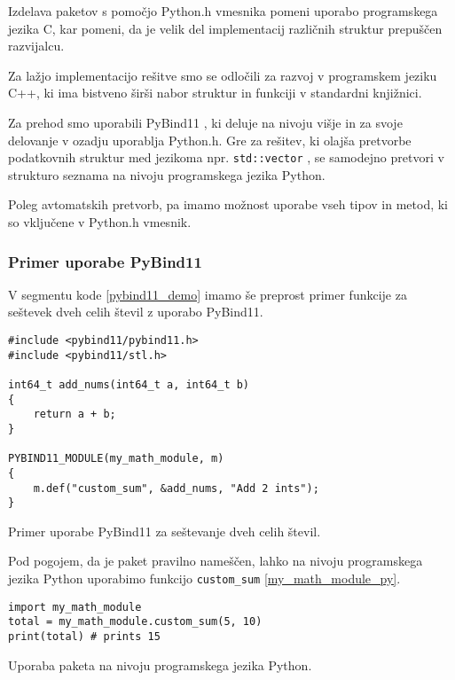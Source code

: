 \documentclass[a4paper,12pt,openright]{book}
\begin{document}
    Izdelava paketov s pomočjo Python.h vmesnika pomeni uporabo programskega jezika C, kar pomeni, da je velik del implementacij različnih struktur prepuščen razvijalcu.
    
    Za lažjo implementacijo rešitve smo se odločili za razvoj v programskem jeziku C++, ki ima bistveno širši nabor struktur in funkciji v standardni knjižnici. 

    Za prehod smo uporabili PyBind11 \cite{PYBIND11_GITHUB}, ki deluje na nivoju višje in za svoje delovanje v ozadju uporablja Python.h. Gre za rešitev, ki olajša pretvorbe podatkovnih struktur med jezikoma npr. {\tt std::vector} \cite{CPP_VECTOR}, se samodejno pretvori v strukturo seznama na nivoju programskega jezika Python.

    Poleg avtomatskih pretvorb, pa imamo možnost uporabe vseh tipov in metod, ki so vključene v Python.h vmesnik.

    \subsubsection{Primer uporabe PyBind11}
    V segmentu kode \ref{pybind11_demo} imamo še preprost primer funkcije za seštevek dveh celih števil z uporabo PyBind11.

\begin{code}
\begin{verbatim}
#include <pybind11/pybind11.h>
#include <pybind11/stl.h>

int64_t add_nums(int64_t a, int64_t b)
{
    return a + b;
}

PYBIND11_MODULE(my_math_module, m)
{
    m.def("custom_sum", &add_nums, "Add 2 ints");
}
\end{verbatim}
\caption{Primer uporabe PyBind11 za seštevanje dveh celih števil.}
\label{pybind11_demo}
\end{code}

    \noindent
    Pod pogojem, da je paket pravilno nameščen, lahko na nivoju programskega jezika Python uporabimo funkcijo {\tt custom\_sum} \ref{my_math_module_py}.

\begin{code}
\begin{verbatim}
import my_math_module
total = my_math_module.custom_sum(5, 10)
print(total) # prints 15
\end{verbatim}
\caption{Uporaba paketa na nivoju programskega jezika Python.}
\label{my_math_module_py}
\end{code}

    \newpage
\end{document}
